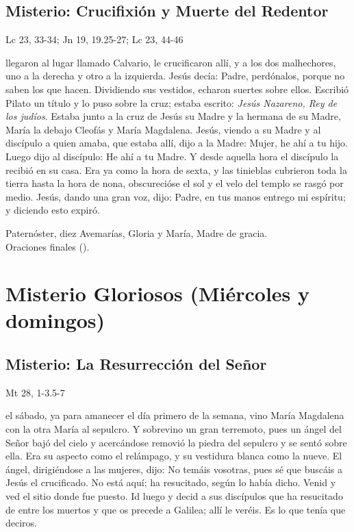 \documentclass[10pt,a4paper,oneside]{book}
\newcounter{sorrowful-counter}
\newcounter{glorious-counter}
\begin{document}
\subsection*{ Misterio: Crucifixión y Muerte del Redentor}
\begin{flushright}
      {\color{red}Lc 23, 33-34; Jn 19, 19.25-27; Lc 23, 44-46}
\end{flushright}
 llegaron al lugar llamado Calvario, le crucificaron allí, y a los dos malhechores, uno a la derecha y otro a la izquierda. Jesús decía: 
Padre, perdónalos, porque no saben los que hacen. Dividiendo sus vestidos, echaron suertes sobre ellos. Escribió Pilato un título y lo puso sobre la cruz; 
estaba escrito: \textit{Jesús Nazareno, Rey de los judíos}. Estaba junto a la cruz de Jesús su Madre y la hermana de su Madre, María la debajo Cleofás y María Magdalena. 
Jesús, viendo a su Madre y al discípulo a quien amaba, que estaba allí, dijo a la Madre: Mujer, he ahí a tu hijo. Luego dijo al discípulo: He ahí a tu Madre. 
Y desde aquella hora el discípulo la recibió en su casa. Era ya como la hora de sexta, y las tinieblas cubrieron toda la tierra hasta la hora de nona, 
obscurecióse el sol y el velo del templo se rasgó por medio. Jesús, dando una gran voz, dijo: Padre, en tus manos entrego mi espíritu; y diciendo esto expiró.

\begin{center}
      Paternóster, diez Avemarías, Gloria y María, Madre de gracia.\\
      Oraciones finales ().
\end{center}

\section*{Misterio Gloriosos (Miércoles y domingos)}
\subsection*{ Misterio: La Resurrección del Señor}
\begin{flushright}
      {\color{red}Mt 28, 1-3.5-7}
\end{flushright}
 el sábado, ya para amanecer el día primero de la semana, vino María Magdalena con la otra María al sepulcro. Y sobrevino un gran terremoto, 
pues un ángel del Señor bajó del cielo y acercándose removió la piedra del sepulcro y se sentó sobre ella. Era su aspecto como el relámpago, y su vestidura blanca como la nueve. 
El ángel, dirigiéndose a las mujeres, dijo: No temáis vosotras, pues sé que buscáis a Jesús el crucificado. No está aquí; ha resucitado, según lo había dicho. 
Venid y ved el sitio donde fue puesto. Id luego y decid a sus discípulos que ha resucitado de entre los muertos y que os precede a Galilea; allí le veréis. 
Es lo que tenía que deciros.
\end{document}
